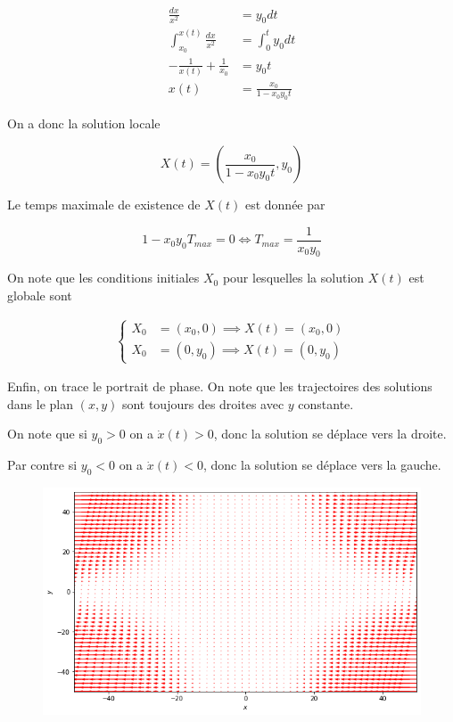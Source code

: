 \documentclass[french]{article}
\begin{document}
	\begin{align}
		\frac{dx}{x^2} &= y_0 dt \\
		\int_{x_0}^{x(t)} \frac{dx}{x^2} &= \int_{0}^{t} y_0 dt \\
		-\frac{1}{x(t)} + \frac{1}{x_0} &= y_0t\\
		x(t) &= \frac{x_0}{1 - x_0y_0 t}
	\end{align}
	
	On a donc la solution locale
	
	\[ X(t) = \left( \frac{x_0}{1 - x_0y_0 t}, y_0\right)\]
	
	Le temps maximale de existence de $X(t)$ est donnée par
	
	\[1 - x_0 y_0 T_{max} = 0 \iff T_{max} = \frac{1}{x_0 y_0}\]
	
	On note que les conditions initiales $X_0$ pour lesquelles la solution $X(t)$ est globale sont
	
	\begin{align}
		\begin{cases}
		X_0 &= (x_0, 0) \implies X(t) = (x_0, 0)\\
		X_0 &= (0, y_0) \implies X(t) = (0, y_0)
		\end{cases}
	\end{align}
	
	Enfin, on trace le portrait de phase. On note que les trajectoires des solutions dans le plan $(x, y)$ sont toujours des droites avec $y$ constante.
	
	On note que si $y_0 > 0$  on a $\dot{x}(t) > 0$, donc la solution se déplace vers la droite.
	
	Par contre si $y_0 < 0$  on a $\dot{x}(t) < 0$, donc la solution se déplace vers la gauche.
	
	\begin{figure}[!h]
		\centering
		\includegraphics[scale=.5]{diagrama_fase1.png}
	\end{figure}
\end{document}
